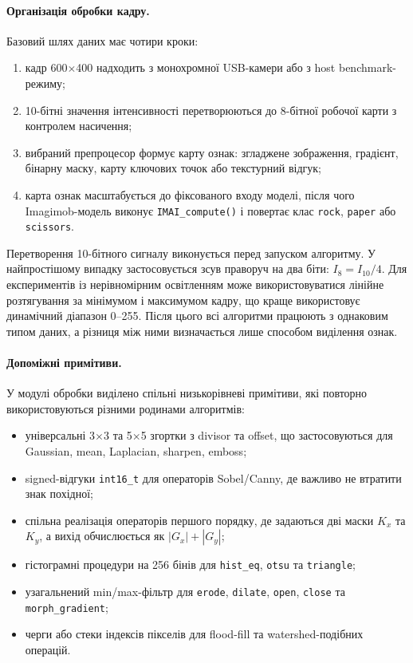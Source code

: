 \documentclass[a4paper,12pt]{article}
\begin{document}
\paragraph{Організація обробки кадру.}
Базовий шлях даних має чотири кроки:
\begin{enumerate}
	\item кадр 600$\times$400 надходить з монохромної USB-камери або з host benchmark-режиму;
	\item 10-бітні значення інтенсивності перетворюються до 8-бітної робочої карти з контролем насичення;
	\item вибраний препроцесор формує карту ознак: згладжене зображення, градієнт, бінарну маску, карту ключових точок або текстурний відгук;
	\item карта ознак масштабується до фіксованого входу моделі, після чого Imagimob-модель виконує \texttt{IMAI\_compute()} і повертає клас \texttt{rock}, \texttt{paper} або \texttt{scissors}.
\end{enumerate}

Перетворення 10-бітного сигналу виконується перед запуском алгоритму. У найпростішому випадку застосовується зсув праворуч на два біти: \(I_8=I_{10}/4\). Для експериментів із нерівномірним освітленням може використовуватися лінійне розтягування за мінімумом і максимумом кадру, що краще використовує динамічний діапазон 0--255. Після цього всі алгоритми працюють з однаковим типом даних, а різниця між ними визначається лише способом виділення ознак.

\paragraph{Допоміжні примітиви.}
У модулі обробки виділено спільні низькорівневі примітиви, які повторно використовуються різними родинами алгоритмів:
\begin{itemize}
	\item універсальні 3$\times$3 та 5$\times$5 згортки з divisor та offset, що застосовуються для Gaussian, mean, Laplacian, sharpen, emboss;
	\item signed-відгуки \texttt{int16\_t} для операторів Sobel/Canny, де важливо не втратити знак похідної;
	\item спільна реалізація операторів першого порядку, де задаються дві маски \(K_x\) та \(K_y\), а вихід обчислюється як \(|G_x|+|G_y|\);
	\item гістограмні процедури на 256 бінів для \texttt{hist\_eq}, \texttt{otsu} та \texttt{triangle};
	\item узагальнений min/max-фільтр для \texttt{erode}, \texttt{dilate}, \texttt{open}, \texttt{close} та \texttt{morph\_gradient};
	\item черги або стеки індексів пікселів для flood-fill та watershed-подібних операцій.
\end{itemize}
\end{document}
